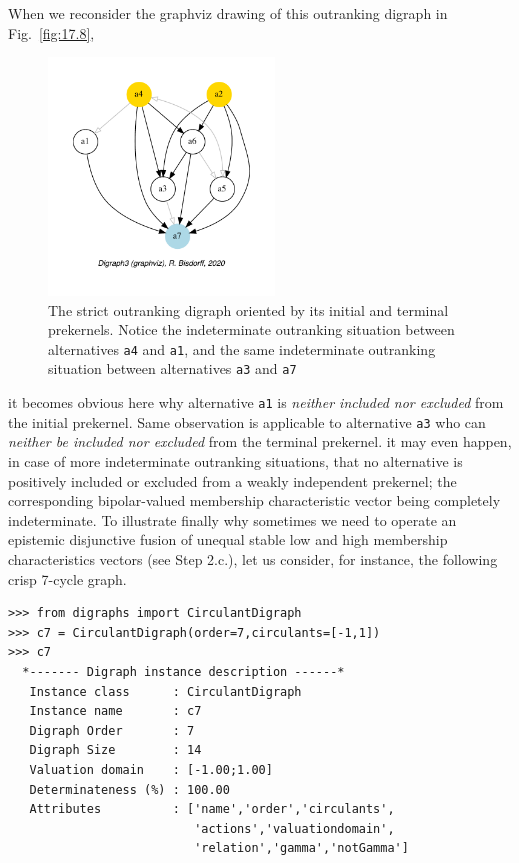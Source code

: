 When we reconsider the graphviz drawing of this outranking digraph in Fig.~\vref{fig:17.8},
\begin{figure}[h]
\sidecaption[t]
\includegraphics[width=6cm]{Figures/17-12-bestWorstOrientation.pdf}
\caption{The strict outranking digraph oriented by its initial and terminal prekernels. Notice the indeterminate outranking situation between alternatives \texttt{a4} and \texttt{a1}, and the same indeterminate outranking situation between alternatives \texttt{a3} and \texttt{a7}}
\label{fig:17.12}       %
\end{figure}
it becomes obvious here why alternative \texttt{a1} is \emph{neither included nor excluded} from the initial prekernel. Same observation is applicable to alternative \texttt{a3} who can \emph{neither be included nor excluded} from the terminal prekernel. it may even happen, in case of more indeterminate outranking situations, that no alternative  is positively included or excluded from a weakly independent prekernel; the corresponding bipolar-valued membership characteristic vector being completely indeterminate.
\clearpage
To illustrate finally why sometimes we need to operate an epistemic disjunctive fusion of unequal stable low and high membership characteristics vectors (see Step 2.c.), let us consider, for instance, the following crisp 7-cycle graph.
\begin{lstlisting}
>>> from digraphs import CirculantDigraph
>>> c7 = CirculantDigraph(order=7,circulants=[-1,1])
>>> c7			     
  *------- Digraph instance description ------*
   Instance class      : CirculantDigraph
   Instance name       : c7
   Digraph Order       : 7
   Digraph Size        : 14
   Valuation domain    : [-1.00;1.00]
   Determinateness (%) : 100.00
   Attributes          : ['name','order','circulants',
                          'actions','valuationdomain',
                          'relation','gamma','notGamma']
\end{lstlisting}		       

